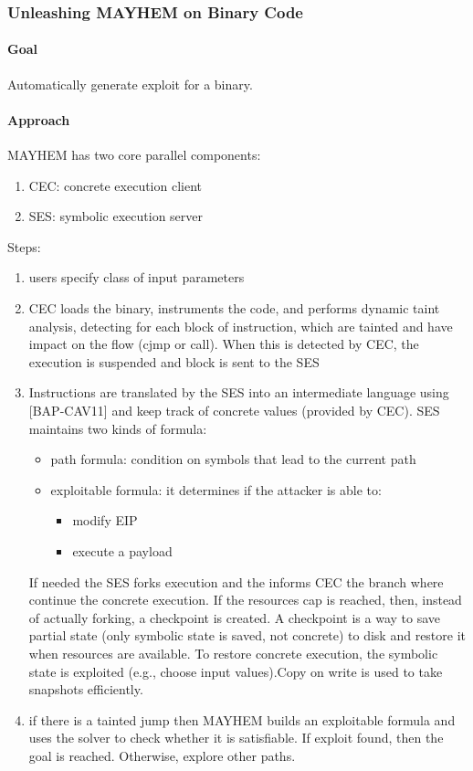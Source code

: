 \subsubsection{\cite{MAYHEM-SP12} Unleashing MAYHEM on Binary Code} 

\paragraph{Goal}
Automatically generate exploit for a binary.

\paragraph{Approach}      
MAYHEM has two core parallel components:
\begin{enumerate}
  \item CEC: concrete execution client
  \item SES: symbolic execution server
\end{enumerate}

Steps:
\begin{enumerate}
  \item users specify class of input parameters
  \item CEC loads the binary, instruments the code, and performs dynamic taint analysis, detecting for each block of instruction, which are tainted and have impact on the flow (cjmp or call). When this is detected by CEC, the execution is suspended and block is sent to the SES
  \item Instructions are translated by the SES into an intermediate language using [BAP-CAV11] and keep track of concrete values (provided by CEC). SES maintains two kinds of formula:
  \begin{itemize}
    \item path formula: condition on symbols that lead to the current path
    \item exploitable formula: it determines if the attacker is able to:
    \begin{itemize}
      \item modify EIP
      \item execute a payload
    \end{itemize}
  \end{itemize}
  If needed the SES forks execution and the informs CEC the branch where continue the concrete execution. If the resources cap is reached, then, instead of actually forking, a checkpoint is created. A checkpoint is a way to save partial state (only symbolic state is saved, not concrete) to disk and restore it when resources are available. To restore concrete execution, the symbolic state is exploited (e.g., choose input values).Copy on write is used to take snapshots efficiently.
  \item if there is a tainted jump then MAYHEM builds an exploitable formula and uses the solver to check whether it is satisfiable. If exploit found, then the goal is reached. Otherwise, explore other paths.
\end{enumerate}

